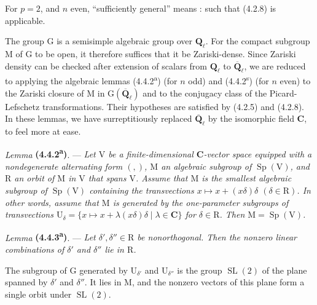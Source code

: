 \documentclass[11pt,leqno]{article}
\begin{document}
For \(p=2\), and \(n\) even, “sufficiently general” means : such that (4.2.8) is applicable.

The group \(\mathrm{G}\) is a semisimple algebraic group over \(\mathbf{Q}_\ell\). For the compact subgroup \(\mathrm{M}\) of \(\mathrm{G}\) to be open, it therefore suffices that it be Zariski-dense. Since Zariski density can be checked after extension of scalars from \(\mathbf{Q}_\ell\) to \(\overline{\mathbf{Q}}_\ell\), we are reduced to applying the algebraic lemmas (4.4.2\textsuperscript{a}) (for \(n\) odd) and (4.4.2\textsuperscript{s}) (for \(n\) even) to the Zariski closure of \(\mathrm{M}\) in \(\mathrm{G}(\overline{\mathbf{Q}}_\ell)\) and to the conjugacy class of the Picard-Lefschetz transformations. Their hypotheses are satisfied by (4.2.5) and (4.2.8). In these lemmas, we have surreptitiously replaced \(\overline{\mathbf{Q}}_\ell\) by the isomorphic field \(\mathbf{C}\), to feel more at ease.

\textit{Lemma} \textbf{(4.4.2\textsuperscript{a})}. — \textit{Let \(\mathrm{V}\) be a finite-dimensional \(\mathbf{C}\)-vector space equipped with a nondegenerate alternating form \((,)\), \(\mathrm{M}\) an algebraic subgroup of \(\operatorname{Sp}(\mathrm{V})\), and \(\mathrm{R}\) an orbit of \(\mathrm{M}\) in \(\mathrm{V}\) that spans \(\mathrm{V}\). Assume that \(\mathrm{M}\) is the smallest algebraic subgroup of \(\operatorname{Sp}(\mathrm{V})\) containing the transvections \(x\mapsto x+(x\delta)\delta\) \((\delta\in\mathrm{R})\). In other words, assume that \(\mathrm{M}\) is generated by the one-parameter subgroups of transvections \(\mathrm{U}_\delta=\{x\mapsto x+\lambda(x\delta)\delta\mid\lambda\in\mathbf{C}\}\) for \(\delta\in\mathrm{R}\). Then \(\mathrm{M}=\operatorname{Sp}(\mathrm{V})\).}

\textit{Lemma} \textbf{(4.4.3\textsuperscript{a})}. — \textit{Let \(\delta',\delta''\in\mathrm{R}\) be nonorthogonal. Then the nonzero linear combinations of \(\delta'\) and \(\delta''\) lie in \(\mathrm{R}\).}

The subgroup of \(\mathrm{G}\) generated by \(\mathrm{U}_{\delta'}\) and \(\mathrm{U}_{\delta''}\) is the group \(\operatorname{SL}(2)\) of the plane spanned by \(\delta'\) and \(\delta''\). It lies in \(\mathrm{M}\), and the nonzero vectors of this plane form a single orbit under \(\operatorname{SL}(2)\).
\end{document}
